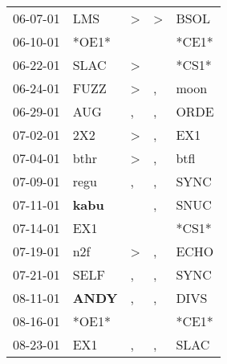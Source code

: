 \begin{supertabular}{p{0.07\textwidth}p{0.06\textwidth}p{0.02\textwidth}p{0.02\textwidth}p{0.06\textwidth}}
 06-07-01\textsuperscript{} &            LMS\textsuperscript{} &     \textgreater &     \textgreater &           BSOL\textsuperscript{} \\
 06-10-01\textsuperscript{} &                            *OE1* &                  &                  &                            *CE1* \\
 06-22-01\textsuperscript{} &           SLAC\textsuperscript{} &     \textgreater &                  &                            *CS1* \\
 06-24-01\textsuperscript{} &           FUZZ\textsuperscript{} &     \textgreater &                , &           moon\textsuperscript{} \\
 06-29-01\textsuperscript{} &            AUG\textsuperscript{} &                , &                , &           ORDE\textsuperscript{} \\
 07-02-01\textsuperscript{} &            2X2\textsuperscript{} &     \textgreater &                , &            EX1\textsuperscript{} \\
 07-04-01\textsuperscript{} &           bthr\textsuperscript{} &     \textgreater &                , &           btfl\textsuperscript{} \\
 07-09-01\textsuperscript{} &           regu\textsuperscript{} &                , &                , &           SYNC\textsuperscript{} \\
 07-11-01\textsuperscript{} &  \textbf{kabu\textsuperscript{}} &                  &                , &           SNUC\textsuperscript{} \\
 07-14-01\textsuperscript{} &            EX1\textsuperscript{} &                  &                  &                            *CS1* \\
 07-19-01\textsuperscript{} &            n2f\textsuperscript{} &     \textgreater &                , &           ECHO\textsuperscript{} \\
 07-21-01\textsuperscript{} &           SELF\textsuperscript{} &                , &                , &           SYNC\textsuperscript{} \\
 08-11-01\textsuperscript{} &  \textbf{ANDY\textsuperscript{}} &                , &                , &           DIVS\textsuperscript{} \\
 08-16-01\textsuperscript{} &                            *OE1* &                  &                  &                            *CE1* \\
 08-23-01\textsuperscript{} &            EX1\textsuperscript{} &                , &                , &           SLAC\textsuperscript{} \\

\end{supertabular}
